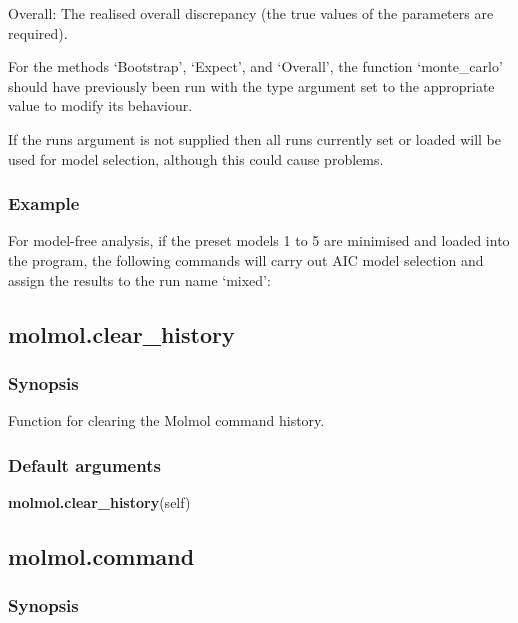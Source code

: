 Overall:  The realised overall discrepancy (the true values of the parameters are required).

For the methods `Bootstrap', `Expect', and `Overall', the function `monte\_carlo' should have
previously been run with the type argument set to the appropriate value to modify its
behaviour.

If the runs argument is not supplied then all runs currently set or loaded will be used for
model selection, although this could cause problems.


\subsubsection{Example}

For model-free analysis, if the preset models 1 to 5 are minimised and loaded into the
program, the following commands will carry out AIC model selection and assign the results
to the run name `mixed':





\newpage

\subsection{molmol.clear\_history}


\subsubsection{Synopsis}

Function for clearing the Molmol command history.

\subsubsection{Default arguments}

\textsf{\textbf{molmol.clear\_history}(self)}



\newpage

\subsection{molmol.command}


\subsubsection{Synopsis}

